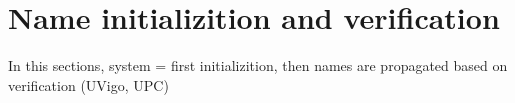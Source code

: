 \section{Name initializition and verification}
\label{sec:clustering}

In this sections, system = first initializition, then names are propagated based on verification (UVigo, UPC)

\endinput
